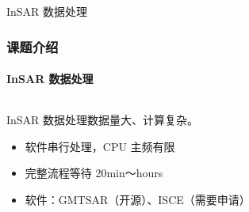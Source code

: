 \documentclass{beamer}
\begin{document}
\begin{frame}{InSAR 数据处理}
    \frametitle{课题介绍}
    \framesubtitle{InSAR 数据处理}

    \begin{columns}
        \begin{column}{0.6\textwidth}
            \begin{scriptsize}
            InSAR 数据处理数据量大、计算复杂。\\
            \begin{itemize}
                \item 软件串行处理，CPU 主频有限
                \item 完整流程等待 20min～hours
                \item 软件：GMTSAR（开源）、ISCE（需要申请）
            \end{itemize}


\end{scriptsize}
\end{column}
\end{columns}
\end{frame}
\end{document}
